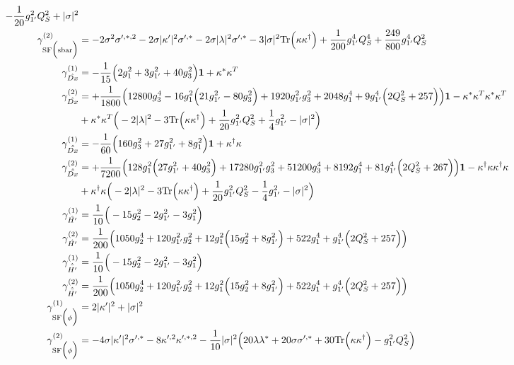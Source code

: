 {\begin{align}
-\frac{1}{20} g_{1'}^{2} Q_{S}^{2}  + |\sigma|^2\\ 
\gamma_{\text{SF}\Big(\text{sbar}\Big)}^{(2)} & =  
-2 \sigma^{2} \sigma^{\prime,*,2}  -2 \sigma |\kappa^\prime|^2 \sigma^{\prime,*}  -2 \sigma |\lambda|^2 \sigma^{\prime,*}  -3 |\sigma|^2 \mbox{Tr}\Big({\kappa  \kappa^{\dagger}}\Big)  + \frac{1}{200} g_{1'}^{4} Q_{S}^{4}  + \frac{249}{800} g_{1'}^{4} Q_{S}^{2} \\ 
\gamma_{\hat{Dx}}^{(1)} & =  
-\frac{1}{15} \Big(2 g_{1}^{2}  + 3 g_{1'}^{2}  + 40 g_{3}^{2} \Big){\bf 1}  + {\kappa^*  \kappa^{T}}\\ 
\gamma_{\hat{Dx}}^{(2)} & =  
+\frac{1}{1800} \Big(12800 g_{3}^{4}  -16 g_{1}^{2} \Big(21 g_{1'}^{2}  -80 g_{3}^{2} \Big) + 1920 g_{1'}^{2} g_{3}^{2}  + 2048 g_{1}^{4}  + 9 g_{1'}^{4} \Big(2 Q_{S}^{2}  + 257\Big)\Big){\bf 1} - {\kappa^*  \kappa^{T}  \kappa^*  \kappa^{T}} \nonumber \\ 
 &+{\kappa^*  \kappa^{T}} \Big(-2 |\lambda|^2  -3 \mbox{Tr}\Big({\kappa  \kappa^{\dagger}}\Big)  + \frac{1}{20} g_{1'}^{2} Q_{S}^{2}  + \frac{1}{4} g_{1'}^{2}  - |\sigma|^2 \Big)\\ 
\gamma_{\hat{\bar{Dx}}}^{(1)} & =  
-\frac{1}{60} \Big(160 g_{3}^{2}  + 27 g_{1'}^{2}  + 8 g_{1}^{2} \Big){\bf 1}  + {\kappa^{\dagger}  \kappa}\\ 
\gamma_{\hat{\bar{Dx}}}^{(2)} & =  
+\frac{1}{7200} \Big(128 g_{1}^{2} \Big(27 g_{1'}^{2}  + 40 g_{3}^{2} \Big) + 17280 g_{1'}^{2} g_{3}^{2}  + 51200 g_{3}^{4}  + 8192 g_{1}^{4}  + 81 g_{1'}^{4} \Big(2 Q_{S}^{2}  + 267\Big)\Big){\bf 1} - {\kappa^{\dagger}  \kappa  \kappa^{\dagger}  \kappa} \nonumber \\ 
 &+{\kappa^{\dagger}  \kappa} \Big(-2 |\lambda|^2  -3 \mbox{Tr}\Big({\kappa  \kappa^{\dagger}}\Big)  + \frac{1}{20} g_{1'}^{2} Q_{S}^{2}  -\frac{1}{4} g_{1'}^{2}  - |\sigma|^2 \Big)\\ 
\gamma_{\hat{H'}}^{(1)} & =  
\frac{1}{10} \Big(-15 g_{2}^{2}  -2 g_{1'}^{2}  -3 g_{1}^{2} \Big)\\ 
\gamma_{\hat{H'}}^{(2)} & =  
\frac{1}{200} \Big(1050 g_{2}^{4}  + 120 g_{1'}^{2} g_{2}^{2}  + 12 g_{1}^{2} \Big(15 g_{2}^{2}  + 8 g_{1'}^{2} \Big) + 522 g_{1}^{4}  + g_{1'}^{4} \Big(2 Q_{S}^{2}  + 257\Big)\Big)\\ 
\gamma_{\hat{\bar{H'}}}^{(1)} & =  
\frac{1}{10} \Big(-15 g_{2}^{2}  -2 g_{1'}^{2}  -3 g_{1}^{2} \Big)\\ 
\gamma_{\hat{\bar{H'}}}^{(2)} & =  
\frac{1}{200} \Big(1050 g_{2}^{4}  + 120 g_{1'}^{2} g_{2}^{2}  + 12 g_{1}^{2} \Big(15 g_{2}^{2}  + 8 g_{1'}^{2} \Big) + 522 g_{1}^{4}  + g_{1'}^{4} \Big(2 Q_{S}^{2}  + 257\Big)\Big)\\ 
\gamma_{\text{SF}\Big(\phi \Big)}^{(1)} & =  
2 |\kappa^\prime|^2  + |\sigma|^2\\ 
\gamma_{\text{SF}\Big(\phi \Big)}^{(2)} & =  
-4 \sigma |\kappa^\prime|^2 \sigma^{\prime,*}  -8 \kappa^{\prime,2} \kappa^{\prime,*,2}  -\frac{1}{10} |\sigma|^2 \Big(20 \lambda \lambda^*  + 20 \sigma \sigma^{\prime,*}  + 30 \mbox{Tr}\Big({\kappa  \kappa^{\dagger}}\Big)  - g_{1'}^{2} Q_{S}^{2} \Big)
\end{align} } 
